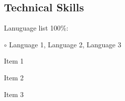 \subsection*{Technical Skills}

\begin{itemize*}
  \item Lanuguage list 100\%: %
  \begin{itemize*}
    \vspace{-0.2em}
    \item[$\circ$] Language 1, Language 2, Language 3
    \vspace{-0.2em}
  \end{itemize*}
    \vspace{-0.2em}
  \item Item 1
  \item Item 2
  \item Item 3
\end{itemize*}


